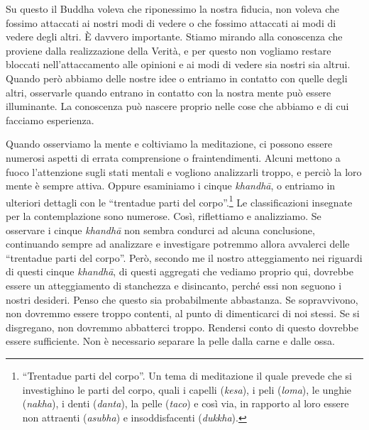 Su questo il Buddha voleva che riponessimo la nostra fiducia, non voleva
che fossimo attaccati ai nostri modi di vedere o che fossimo attaccati
ai modi di vedere degli altri. È davvero importante. Stiamo mirando alla
conoscenza che proviene dalla realizzazione della Verità, e per questo
non vogliamo restare bloccati nell'attaccamento alle opinioni e ai modi
di vedere sia nostri sia altrui. Quando però abbiamo delle nostre idee o
entriamo in contatto con quelle degli altri, osservarle quando entrano
in contatto con la nostra mente può essere illuminante. La conoscenza
può nascere proprio nelle cose che abbiamo e di cui facciamo esperienza.

Quando osserviamo la mente e coltiviamo la meditazione, ci possono
essere numerosi aspetti di errata comprensione o fraintendimenti. Alcuni
mettono a fuoco l'attenzione sugli stati mentali e vogliono analizzarli
troppo, e perciò la loro mente è sempre attiva. Oppure esaminiamo i
cinque \emph{khandhā}, o entriamo in ulteriori dettagli con le
``trentadue parti del corpo''.\footnote{``Trentadue parti del corpo''.
  Un tema di meditazione il quale prevede che si investighino le parti
  del corpo, quali i capelli (\emph{kesa}), i peli (\emph{loma}), le
  unghie (\emph{nakha}), i denti (\emph{danta}), la pelle (\emph{taco})
  e così via, in rapporto al loro essere non attraenti (\emph{asubha}) e
  insoddisfacenti (\emph{dukkha}).} Le classificazioni insegnate per la
contemplazione sono numerose. Così, riflettiamo e analizziamo. Se
osservare i cinque \emph{khandhā} non sembra condurci ad alcuna
conclusione, continuando sempre ad analizzare e investigare potremmo
allora avvalerci delle ``trentadue parti del corpo''. Però, secondo me
il nostro atteggiamento nei riguardi di questi cinque \emph{khandhā}, di
questi aggregati che vediamo proprio qui, dovrebbe essere un
atteggiamento di stanchezza e disincanto, perché essi non seguono i
nostri desideri. Penso che questo sia probabilmente abbastanza. Se
sopravvivono, non dovremmo essere troppo contenti, al punto di
dimenticarci di noi stessi. Se si disgregano, non dovremmo abbatterci
troppo. Rendersi conto di questo dovrebbe essere sufficiente. Non è
necessario separare la pelle dalla carne e dalle ossa.

